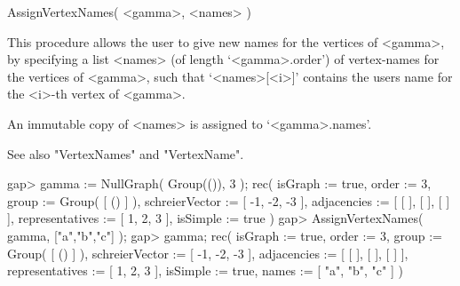 
\>AssignVertexNames( <gamma>, <names> )

This procedure allows the user to give new names for the vertices of
<gamma>, by specifying a list <names> (of length `<gamma>.order') of
vertex-names for the vertices of <gamma>, such that `<names>[<i>]'
contains the user{\pif}s name for the <i>-th vertex of <gamma>.

An immutable copy of <names> is assigned to `<gamma>.names'. 

See also "VertexNames" and "VertexName".

\beginexample
gap> gamma := NullGraph( Group(()), 3 );
rec(
  isGraph := true,
  order := 3,
  group := Group( [ () ] ),
  schreierVector := [ -1, -2, -3 ],
  adjacencies := [ [  ], [  ], [  ] ],
  representatives := [ 1, 2, 3 ],
  isSimple := true )
gap> AssignVertexNames( gamma, ["a","b","c"] );
gap> gamma;
rec(
  isGraph := true,
  order := 3,
  group := Group( [ () ] ),
  schreierVector := [ -1, -2, -3 ],
  adjacencies := [ [  ], [  ], [  ] ],
  representatives := [ 1, 2, 3 ],
  isSimple := true,
  names := [ "a", "b", "c" ] )
\endexample
